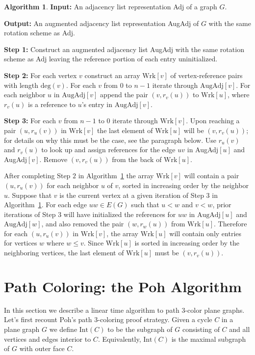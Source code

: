 \documentclass[12pt,letterpaper]{article}
\theoremstyle{plain}
\theoremstyle{definition}
\theoremstyle{break}
\newtheorem{algorithm}[lemma]{Algorithm}     %
\begin{document}
\begin{algorithm}\label{A:augment}
\textbf{Input:} An adjacency list representation Adj of a graph $G$.

\textbf{Output:} An augmented adjacency list representation AugAdj of
$G$ with the same rotation scheme as Adj.

\textbf{Step 1:} Construct an augmented adjacency list AugAdj with
the same rotation scheme as Adj leaving the reference portion of each entry
uninitialized.

\textbf{Step 2:} For each vertex $v$ construct an array $\text{Wrk}[v]$
of vertex-reference pairs with length $\text{deg}(v)$. For each $v$ from
$0$ to $n-1$ iterate through
$\text{AugAdj}[v]$. For each neighbor $u$ in $\text{AugAdj}[v]$ append the pair
$(v,r_v(u))$ to
$\text{Wrk}[u]$, where $r_v(u)$ is a reference to $u$'s entry in
$\text{AugAdj}[v]$.

\textbf{Step 3:} For each $v$ from $n-1$ to $0$ iterate through
$\text{Wrk}[v]$. Upon reaching a pair $(u,r_u(v))$ in $\text{Wrk}[v]$ the
last element of $\text{Wrk}[u]$ will be $(v,r_v(u))$; for details on why this
must be the case, see the paragraph below. Use
$r_u(v)$ and $r_v(u)$ to look up and assign references for the edge $uv$ in
AugAdj$[u]$ and AugAdj$[v]$. Remove $(v,r_v(u))$ from the back of
$\text{Wrk}[u]$.
\end{algorithm}

After completing Step $2$ in Algorithm~\ref{A:augment} the array $\text{Wrk}[v]$
will contain
a pair $(u,r_u(v))$ for each neighbor $u$ of $v$, sorted in increasing order by
the neighbor $u$.
Suppose that $v$ is the current vertex at a given iteration of Step $3$ in
Algorithm~\ref{A:augment}. For each edge $uw\in E(G)$ such that
$u<w$ and $v<w$, prior iterations of Step 3 will have initialized the
references for $uw$ in $\text{AugAdj}[u]$ and $\text{AugAdj}[w]$, and also
removed the pair
$(w,r_w(u))$ from $\text{Wrk}[u]$. Therefore for each $(u,r_u(v))$ in
$\text{Wrk}[v]$, the array $\text{Wrk}[u]$ will contain only entries for
vertices $w$ where $w\le v$. Since $\text{Wrk}[u]$ is sorted in
increasing order by the neighboring vertices, the last element of
$\text{Wrk}[u]$ must be $(v,r_v(u))$.

\section{Path Coloring: the Poh Algorithm}

In this section we describe a linear time algorithm to path $3$-color
plane graphs. Let's first recount Poh's path $3$-coloring proof strategy.
Given a cycle $C$ in a plane graph $G$ we define $\text{Int}(C)$ to
be the subgraph of $G$ consisting of $C$ and all vertices and edges interior to
$C$. Equivalently, $\text{Int}(C)$ is the maximal subgraph of $G$ with
outer face $C$.
\end{document}
